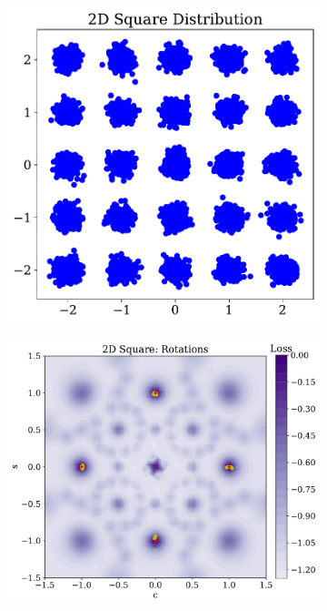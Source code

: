 \begin{figure}
    \begin{subfigure}[b]{0.27\textwidth}
        \centering
        \includegraphics[height=\textwidth]{figures/chapter-09/2d_squareplot.pdf}
        \caption{}
        \label{fig:otherdistributions_2D_iv}
    \end{subfigure}
    \hfill
    \begin{subfigure}[b]{0.28\textwidth}
        \centering
        \includegraphics[height=\textwidth]{figures/chapter-09/2dsquarerotations.pdf}

\end{subfigure}
\end{figure}
